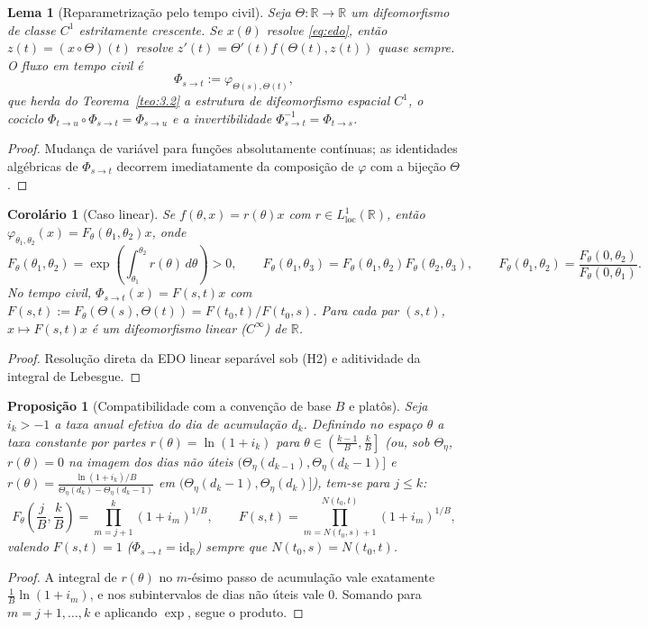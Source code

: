 \documentclass[11pt, a4paper]{article}
\theoremstyle{definition}
\theoremstyle{plain}
\newtheorem{lema}[definicao]{Lema}
\newtheorem{proposicao}[definicao]{Proposição}
\newtheorem{corolario}[definicao]{Corolário}
\theoremstyle{remark}
\begin{document}
\begin{lema}[Reparametrização pelo tempo civil]\label{lem:3.3}
Seja $\Theta : \mathbb{R} \to \mathbb{R}$ um difeomorfismo de classe $C^1$ estritamente crescente. Se $x(\theta)$ resolve \eqref{eq:edo}, então $z(t) = (x \circ \Theta)(t)$ resolve $z'(t) = \Theta'(t) f(\Theta(t), z(t))$ quase sempre. O fluxo em tempo civil é
\[
\Phi_{s \to t} := \varphi_{\Theta(s), \Theta(t)},
\]
que herda do Teorema~\ref{teo:3.2} a estrutura de difeomorfismo espacial $C^1$, o cociclo $\Phi_{t \to u} \circ \Phi_{s \to t} = \Phi_{s \to u}$ e a invertibilidade $\Phi_{s \to t}^{-1} = \Phi_{t \to s}$.
\end{lema}
\begin{proof}
Mudança de variável para funções absolutamente contínuas; as identidades algébricas de $\Phi_{s \to t}$ decorrem imediatamente da composição de $\varphi$ com a bijeção $\Theta$.
\end{proof}

\begin{corolario}[Caso linear]\label{cor:3.4}
Se $f(\theta, x) = r(\theta)x$ com $r \in L^1_{\text{loc}}(\mathbb{R})$, então $\varphi_{\theta_1, \theta_2}(x) = F_\theta(\theta_1, \theta_2)x$, onde
\[
F_\theta(\theta_1, \theta_2) = \exp\left(\int_{\theta_1}^{\theta_2} r(\theta)\,d\theta\right) > 0, \qquad F_\theta(\theta_1, \theta_3) = F_\theta(\theta_1, \theta_2) F_\theta(\theta_2, \theta_3), \qquad F_\theta(\theta_1, \theta_2) = \frac{F_\theta(0, \theta_2)}{F_\theta(0, \theta_1)}.
\]
No tempo civil, $\Phi_{s \to t}(x) = F(s,t)x$ com $F(s,t) := F_\theta(\Theta(s), \Theta(t)) = F(t_0, t)/F(t_0, s)$. Para cada par $(s,t)$, $x \mapsto F(s,t)x$ é um difeomorfismo linear ($C^\infty$) de $\mathbb{R}$.
\end{corolario}
\begin{proof}
Resolução direta da EDO linear separável sob (H2) e aditividade da integral de Lebesgue.
\end{proof}

\begin{proposicao}[Compatibilidade com a convenção de base $B$ e platôs]\label{prop:3.5}
Seja $i_k > -1$ a taxa anual efetiva do dia de acumulação $d_k$. Definindo no espaço $\theta$ a taxa constante por partes $r(\theta) = \ln(1 + i_k)$ para $\theta \in \left(\frac{k-1}{B}, \frac{k}{B}\right]$ (ou, sob $\Theta_\eta$, $r(\theta) = 0$ na imagem dos dias não úteis $(\Theta_\eta(d_{k-1}), \Theta_\eta(d_k - 1)]$ e $r(\theta) = \frac{\ln(1+i_k)/B}{\Theta_\eta(d_k) - \Theta_\eta(d_k - 1)}$ em $(\Theta_\eta(d_k - 1), \Theta_\eta(d_k)]$), tem-se para $j \le k$:
\[
F_\theta\left(\frac{j}{B}, \frac{k}{B}\right) = \prod_{m = j+1}^{k} (1 + i_m)^{1/B}, \qquad F(s,t) = \prod_{m = N(t_0, s) + 1}^{N(t_0, t)} (1 + i_m)^{1/B},
\]
valendo $F(s,t) = 1$ ($\Phi_{s \to t} = \mathrm{id}_{\mathbb{R}}$) sempre que $N(t_0, s) = N(t_0, t)$.
\end{proposicao}
\begin{proof}
A integral de $r(\theta)$ no $m$-ésimo passo de acumulação vale exatamente $\frac{1}{B}\ln(1 + i_m)$, e nos subintervalos de dias não úteis vale $0$. Somando para $m = j+1, \dots, k$ e aplicando $\exp$, segue o produto.
\end{proof}
\end{document}
